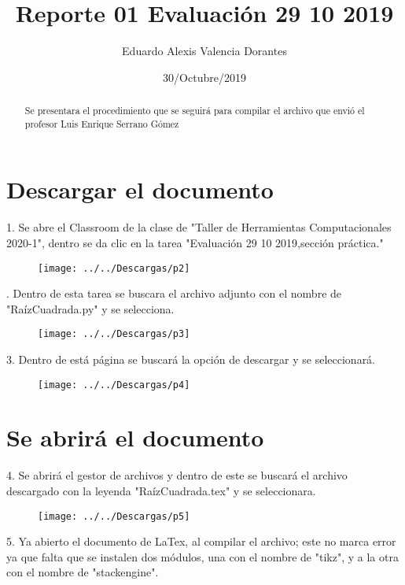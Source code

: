 \documentclass[letter,12pt]{article}
\title{Reporte 01 Evaluación 29 10 2019}
\author{Eduardo Alexis Valencia Dorantes}
\date{30/Octubre/2019}
\begin{document}
	

\begin{abstract}
Se presentara el procedimiento que se seguirá para compilar el archivo que envió el profesor Luis Enrique Serrano Gómez
\end{abstract}

\section*{Descargar el documento}
1. Se abre el Classroom de la clase de "Taller de Herramientas Computacionales 2020-1", dentro se da clic en la tarea "Evaluación 29 10 2019,sección práctica."

\begin{figure}[h]
	\centering
	\texttt{[image: ../../Descargas/p2]}
	\caption{}
	\label{fig:p2}
\end{figure}

. Dentro de esta tarea se buscara el archivo adjunto con el nombre de "RaízCuadrada.py" y se selecciona.

\begin{figure}[h]
	\centering
	\texttt{[image: ../../Descargas/p3]}
	\caption{}
	\label{fig:p3}
\end{figure}


3. Dentro de está página se buscará la opción de descargar y se seleccionará.

\begin{figure}[h]
	\centering
	\texttt{[image: ../../Descargas/p4]}
	\caption{}
	\label{fig:p4}
\end{figure}
\newpage
\section*{Se abrirá el documento}
4. Se abrirá el gestor de archivos y dentro de este se buscará el archivo descargado con la leyenda "RaízCuadrada.tex" y se seleccionara.

\begin{figure}[h]
	\centering
	\texttt{[image: ../../Descargas/p5]}
	\caption{}
	\label{fig:p5}
\end{figure}

5. Ya abierto el documento de LaTex, al compilar el archivo; este no marca error ya que falta que se instalen dos módulos, una con el nombre de "tikz", y a la otra con el nombre de "stackengine".
\end{document}
